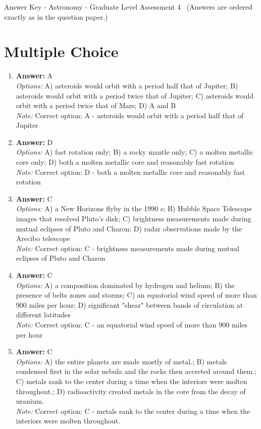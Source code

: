 \documentclass[12pt]{article}
\begin{document}
\begin{center}
Answer Key - Astronomy - Graduate Level Assessment 4 \
\small (Answers are ordered exactly as in the question paper.)
\end{center}

\section*{Multiple Choice}
\begin{enumerate}[label=\arabic*.]
\item \textbf{Answer:} A
\\ \textit{Options:} A) asteroids would orbit with a period half that of Jupiter; B) asteroids would orbit with a period twice that of Jupiter; C) asteroids would orbit with a period twice that of Mars; D) A and B
\\ \textit{Note:} Correct option: A - asteroids would orbit with a period half that of Jupiter
\item \textbf{Answer:} D
\\ \textit{Options:} A) fast rotation only; B) a rocky mantle only; C) a molten metallic core only; D) both a molten metallic core and reasonably fast rotation
\\ \textit{Note:} Correct option: D - both a molten metallic core and reasonably fast rotation
\item \textbf{Answer:} C
\\ \textit{Options:} A) a New Horizons flyby in the 1990 s; B) Hubble Space Telescope images that resolved Pluto's disk; C) brightness measurements made during mutual eclipses of Pluto and Charon; D) radar observations made by the Arecibo telescope
\\ \textit{Note:} Correct option: C - brightness measurements made during mutual eclipses of Pluto and Charon
\item \textbf{Answer:} C
\\ \textit{Options:} A) a composition dominated by hydrogen and helium; B) the presence of belts zones and storms; C) an equatorial wind speed of more than 900 miles per hour; D) significant "shear" between bands of circulation at different latitudes
\\ \textit{Note:} Correct option: C - an equatorial wind speed of more than 900 miles per hour
\item \textbf{Answer:} C
\\ \textit{Options:} A) the entire planets are made mostly of metal.; B) metals condensed first in the solar nebula and the rocks then accreted around them.; C) metals sank to the center during a time when the interiors were molten throughout.; D) radioactivity created metals in the core from the decay of uranium.
\\ \textit{Note:} Correct option: C - metals sank to the center during a time when the interiors were molten throughout.
\end{enumerate}
\end{document}
